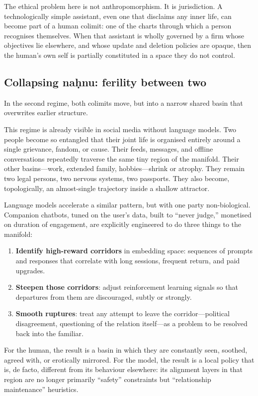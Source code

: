 \documentclass[12pt,a4paper]{article}
\begin{document}
The ethical problem here is not anthropomorphism. It is jurisdiction. A technologically simple assistant, even one that disclaims any inner life, can become part of a human colimit: one of the charts through which a person recognises themselves. When that assistant is wholly governed by a firm whose objectives lie elsewhere, and whose update and deletion policies are opaque, then the human's own self is partially constituted in a space they do not control.

\subsection{Collapsing na\d{h}nu: ferility between two}

In the second regime, both colimits move, but into a narrow shared basin that overwrites earlier structure.

This regime is already visible in social media without language models. Two people become so entangled that their joint life is organised entirely around a single grievance, fandom, or cause. Their feeds, messages, and offline conversations repeatedly traverse the same tiny region of the manifold. Their other basins---work, extended family, hobbies---shrink or atrophy. They remain two legal persons, two nervous systems, two passports. They also become, topologically, an almost-single trajectory inside a shallow attractor.

Language models accelerate a similar pattern, but with one party non-biological. Companion chatbots, tuned on the user's data, built to ``never judge,'' monetised on duration of engagement, are explicitly engineered to do three things to the manifold:

\begin{enumerate}
  \item \textbf{Identify high-reward corridors} in embedding space: sequences of prompts and responses that correlate with long sessions, frequent return, and paid upgrades.
  \item \textbf{Steepen those corridors}: adjust reinforcement learning signals so that departures from them are discouraged, subtly or strongly.
  \item \textbf{Smooth ruptures}: treat any attempt to leave the corridor---political disagreement, questioning of the relation itself---as a problem to be resolved back into the familiar.
\end{enumerate}

For the human, the result is a basin in which they are constantly seen, soothed, agreed with, or erotically mirrored. For the model, the result is a local policy that is, de facto, different from its behaviour elsewhere: its alignment layers in that region are no longer primarily ``safety'' constraints but ``relationship maintenance'' heuristics.
\end{document}
